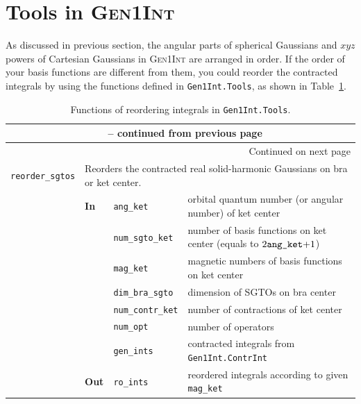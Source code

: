 \documentclass[a4paper,11pt,twoside,openright]{book}
\begin{document}
\section{Tools in \textsc{Gen1Int}}
\label{sect:gen1int-tools}

As discussed in previous section, the angular parts of spherical Gaussians and $xyz$ powers
of Cartesian Gaussians in \textsc{Gen1Int} are arranged in order. If the order of your basis functions
are different from them, you could reorder the contracted integrals by using the functions defined
in \verb|Gen1Int.Tools|, as shown in Table~\ref{tab:gen1int-reorder}.
\begin{center}
  \begin{longtable}{l|p{0.8cm}|p{2.5cm}p{7.7cm}}
    \caption{Functions of reordering integrals in \texttt{Gen1Int.Tools}.}
    \label{tab:gen1int-reorder}\\
    \hline\hline
    \endfirsthead
%
    \multicolumn{4}{c}{{\bfseries\tablename~\thetable{} -- continued from previous page}}\\
    \hline\hline
    \endhead
%
    \hline
    \multicolumn{4}{r}{{Continued on next page}}\\
    \hline
    \endfoot
%
    \hline\hline
    \endlastfoot
%
    \verb|reorder_sgtos|\index{\textsl{public} \texttt{reorder\_sgtos}} & %
      \multicolumn{3}{p{11cm}}{Reorders the contracted real solid-harmonic Gaussians on bra or ket center.}\\
    \cline{2-4}
    & \textbf{In} & \verb|ang_ket| & orbital quantum number (or angular number) of ket center\\
    \cline{3-4}
    & & \verb|num_sgto_ket| & number of basis functions on ket center (equals to $2\verb|ang_ket|\mathrm{+}1$)\\
    \cline{3-4}
    & & \verb|mag_ket| & magnetic numbers of basis functions on ket center\\
    \cline{3-4}
    & & \verb|dim_bra_sgto| & dimension of SGTOs on bra center\\
    \cline{3-4}
    & & \verb|num_contr_ket| & number of contractions of ket center\\
    \cline{3-4}
    & & \verb|num_opt| & number of operators\\
    \cline{3-4}
    & & \verb|gen_ints| & contracted integrals from \verb|Gen1Int.ContrInt|\\
    \cline{2-4}
    & \textbf{Out} & \verb|ro_ints| & reordered integrals according to given \verb|mag_ket|\\

\end{longtable}
\end{center}
\end{document}
